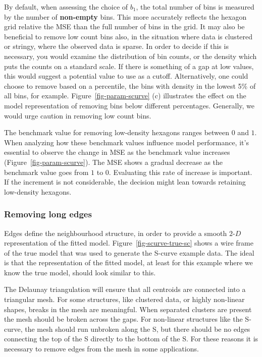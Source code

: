 \documentclass[
  12pt]{article}
\newcommand\gD{$2\text{-}D$}
\begin{document}
By default, when assessing the choice of \(b_1\), the total number of
bins is measured by the number of \textbf{non-empty} bins. This more
accurately reflects the hexagon grid relative the MSE than the full
number of bins in the grid. It may also be beneficial to remove low
count bins also, in the situation where data is clustered or stringy,
where the observed data is sparse. In order to decide if this is
necessary, you would examine the distribution of bin counts, or the
density which puts the counts on a standard scale. If there is something
of a gap at low values, this would suggest a potential value to use as a
cutoff. Alternatively, one could choose to remove based on a percentile,
the bins with density in the lowest 5\% of all bins, for example.
Figure~\ref{fig-param-scurve} (c) illustrates the effect on the model
representation of removing bins below different percentages. Generally,
we would urge caution in removing low count bins.

The benchmark value for removing low-density hexagons ranges between
\(0\) and \(1\). When analyzing how these benchmark values influence
model performance, it's essential to observe the change in MSE as the
benchmark value increases (Figure~\ref{fig-param-scurve}). The MSE shows
a gradual decrease as the benchmark value goes from \(1\) to \(0\).
Evaluating this rate of increase is important. If the increment is not
considerable, the decision might lean towards retaining low-density
hexagons.

\subsubsection{Removing long edges}\label{removing-long-edges}

Edges define the neighbourhood structure, in order to provide a smooth
\gD{} representation of the fitted model.
Figure~\ref{fig-scurve-true-sc} shows a wire frame of the true model
that was used to generate the S-curve example data. The ideal is that
the representation of the fitted model, at least for this example where
we know the true model, should look similar to this.

The Delaunay triangulation will ensure that all centroids are connected
into a triangular mesh. For some structures, like clustered data, or
highly non-linear shapes, breaks in the mesh are meaningful. When
separated clusters are present the mesh should be broken across the
gaps. For non-linear structures like the S-curve, the mesh should run
unbroken along the S, but there should be no edges connecting the top of
the S directly to the bottom of the S. For these reasons it is necessary
to remove edges from the mesh in some applications.
\end{document}
